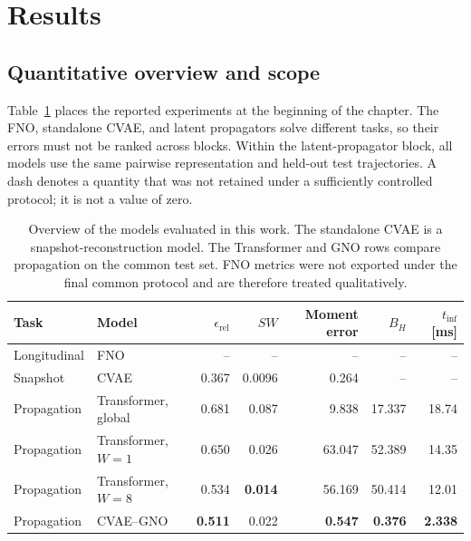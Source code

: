 \section{Results}
\label{sec:results}

\subsection{Quantitative overview and scope}
\label{subsec:results_overview}

Table~\ref{tab:global_model_comparison} places the reported experiments at the beginning of the chapter. The FNO, standalone CVAE, and latent propagators solve different tasks, so their errors must not be ranked across blocks. Within the latent-propagator block, all models use the same pairwise representation and held-out test trajectories. A dash denotes a quantity that was not retained under a sufficiently controlled protocol; it is not a value of zero.

\begin{table}[H]
    \centering
    \small
    \caption{Overview of the models evaluated in this work. The standalone CVAE is a snapshot-reconstruction model. The Transformer and GNO rows compare propagation on the common test set. FNO metrics were not exported under the final common protocol and are therefore treated qualitatively.}
    \label{tab:global_model_comparison}
    \begin{tabular}{llrrrrr}
        \toprule
        Task & Model & $\epsilon_{\mathrm{rel}}$ & $SW$ & Moment error & $B_H$ & $t_{\mathrm{inf}}$ [ms] \\
        \midrule
        Longitudinal & FNO & -- & -- & -- & -- & -- \\
        Snapshot & CVAE & 0.367 & 0.0096 & 0.264 & -- & -- \\
        \midrule
        Propagation & Transformer, global & 0.681 & 0.087 & 9.838 & 17.337 & 18.74 \\
        Propagation & Transformer, $W=1$ & 0.650 & 0.026 & 63.047 & 52.389 & 14.35 \\
        Propagation & Transformer, $W=8$ & 0.534 & \textbf{0.014} & 56.169 & 50.414 & 12.01 \\
        Propagation & CVAE--GNO & \textbf{0.511} & 0.022 & \textbf{0.547} & \textbf{0.376} & \textbf{2.338} \\
        \bottomrule
    \end{tabular}
\end{table}

